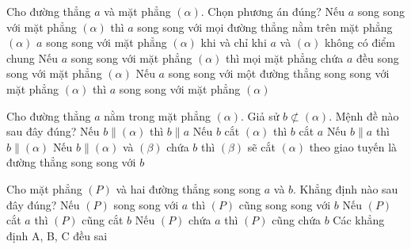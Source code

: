 \begin{ex}%
	Cho đường thẳng $a$  và mặt phẳng $(\alpha)$. Chọn phương án đúng?
	\choice 
		{Nếu $a$ song  song với mặt phẳng $(\alpha)$ thì $a$ song song với mọi đường thẳng nằm trên mặt phẳng $(\alpha)$}
		{\True $a$ song song với mặt phẳng $(\alpha)$ khi và chỉ khi $a$ và $\left(\alpha \right)$ không có điểm  chung}
		{Nếu $a$ song song với mặt phẳng  $(\alpha)$ thì mọi mặt phẳng chứa $a$ đều song song với mặt phẳng $(\alpha)$}
		{Nếu $a$ song song với một đường thẳng song song với mặt  phẳng $(\alpha)$ thì $a$ song song với mặt phẳng $(\alpha)$}
\end{ex}

\begin{ex}%
	Cho đường thẳng $a$ nằm trong mặt phẳng $\left(\alpha \right)$. Giả sử $b\not\subset \left(\alpha \right)$.  Mệnh đề nào sau đây đúng?
	 \choice
		 {Nếu $b \parallel \left(\alpha \right)$ thì $b \parallel a$}
		{Nếu $b$ cắt $\left(\alpha \right)$ thì $b$ cắt  $a$}
		{\True Nếu $b  \parallel a$ thì $b \parallel \left(\alpha \right)$}
		{Nếu $b \parallel \left(\alpha \right)$ và $\left(\beta \right)$ chứa $b$ thì $\left(\beta \right)$  sẽ cắt $\left(\alpha \right)$ theo giao tuyến là đường thẳng song song với $b$}
\end{ex}

\begin{ex}%
	Cho mặt phẳng $( P)$ và hai đường thẳng song song $ a$ và $ b$. Khẳng định  nào sau đây đúng?
	\choice 
		 {Nếu $( P)$ song song với $ a$ thì $( P)$ cũng song song với $ b $}
		{\True Nếu $( P)$ cắt $ a$ thì  $( P)$ cũng cắt $ b $}
		{Nếu $( P)$ chứa $ a$  thì $( P)$ cũng chứa $ b $}
		{Các khẳng định A, B, C đều  sai}
\end{ex}

